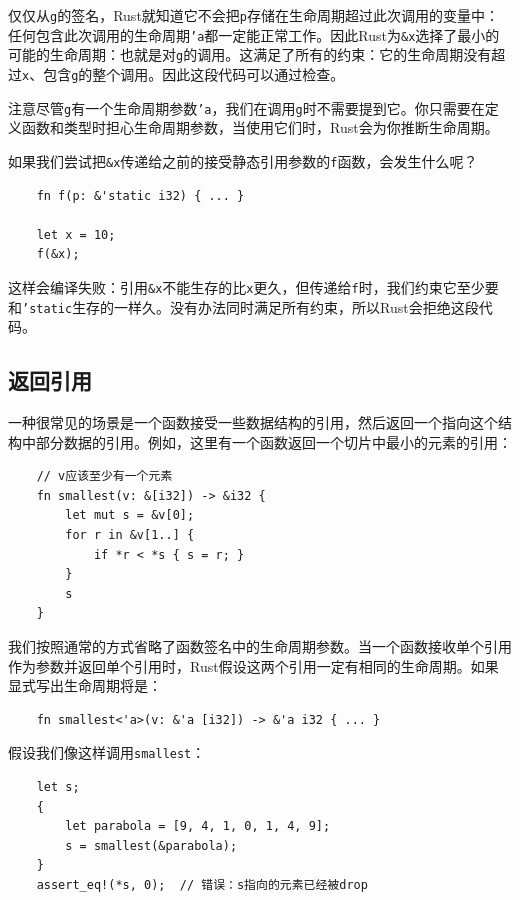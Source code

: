 仅仅从\texttt{g}的签名，Rust就知道它不会把\texttt{p}存储在生命周期超过此次调用的变量中：任何包含此次调用的生命周期\texttt{'a}都一定能正常工作。因此Rust为\texttt{\&x}选择了最小的可能的生命周期：也就是对\texttt{g}的调用。这满足了所有的约束：它的生命周期没有超过\texttt{x}、包含\texttt{g}的整个调用。因此这段代码可以通过检查。

注意尽管\texttt{g}有一个生命周期参数\texttt{'a}，我们在调用\texttt{g}时不需要提到它。你只需要在定义函数和类型时担心生命周期参数，当使用它们时，Rust会为你推断生命周期。

如果我们尝试把\texttt{\&x}传递给之前的接受静态引用参数的\texttt{f}函数，会发生什么呢？
\begin{verbatim}
    fn f(p: &'static i32) { ... }

    let x = 10;
    f(&x);
\end{verbatim}

这样会编译失败：引用\texttt{\&x}不能生存的比\texttt{x}更久，但传递给\texttt{f}时，我们约束它至少要和\texttt{'static}生存的一样久。没有办法同时满足所有约束，所以Rust会拒绝这段代码。

\subsection{返回引用}
一种很常见的场景是一个函数接受一些数据结构的引用，然后返回一个指向这个结构中部分数据的引用。例如，这里有一个函数返回一个切片中最小的元素的引用：
\begin{verbatim}
    // v应该至少有一个元素
    fn smallest(v: &[i32]) -> &i32 {
        let mut s = &v[0];
        for r in &v[1..] {
            if *r < *s { s = r; }
        }
        s
    }
\end{verbatim}

我们按照通常的方式省略了函数签名中的生命周期参数。当一个函数接收单个引用作为参数并返回单个引用时，Rust假设这两个引用一定有相同的生命周期。如果显式写出生命周期将是：
\begin{verbatim}
    fn smallest<'a>(v: &'a [i32]) -> &'a i32 { ... }
\end{verbatim}

假设我们像这样调用\texttt{smallest}：
\begin{verbatim}
    let s;
    {
        let parabola = [9, 4, 1, 0, 1, 4, 9];
        s = smallest(&parabola);
    }
    assert_eq!(*s, 0);  // 错误：s指向的元素已经被drop
\end{verbatim}

